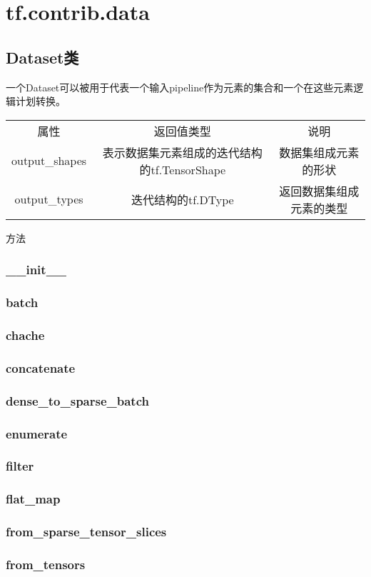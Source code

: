 \section{tf.contrib.data}
\subsection{Dataset类}
一个Dataset可以被用于代表一个输入pipeline作为元素的集合和一个在这些元素逻辑计划转换。
\begin{tabular}{|c|c|c|}
属性&返回值类型&说明\\
output\_shapes&表示数据集元素组成的迭代结构的tf.TensorShape&数据集组成元素的形状\\
output\_types&迭代结构的tf.DType&返回数据集组成元素的类型&\\
\end{tabular}
方法
\subsubsection{\_\_init\_\_}
\subsubsection{batch}
\subsubsection{chache}
\subsubsection{concatenate}
\subsubsection{dense\_to\_sparse\_batch}
\subsubsection{enumerate}
\subsubsection{filter}
\subsubsection{flat\_map}
\subsubsection{from\_sparse\_tensor\_slices}
\subsubsection{from\_tensors}
